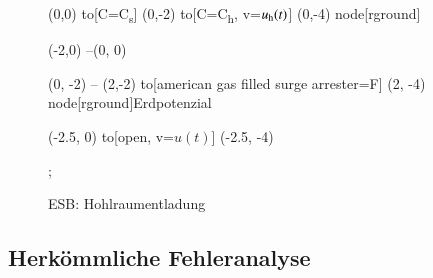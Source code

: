\begin{refsection}
\begin{figure}[h]
\begin{circuitikz} [european, scale=0.8]
		(0,0)
		to[C=C\textsubscript{s}] (0,-2) 
		to[C=C\textsubscript{h}, v=$u\textsubscript{h}(t)$] (0,-4)
		node[rground]{}
		
		(-2,0) --(0, 0)
		
		(0, -2) -- (2,-2) to[american gas filled surge arrester=F] (2, -4)
		node[rground]{Erdpotenzial}
		
		(-2.5, 0) to[open, v=$u(t)$] (-2.5, -4)
		 
		;
	\end{circuitikz}
	\caption{ESB: Hohlraumentladung} \label{fig:M2}
\end{figure}
  
\subsection{Herkömmliche Fehleranalyse}


\end{refsection}
